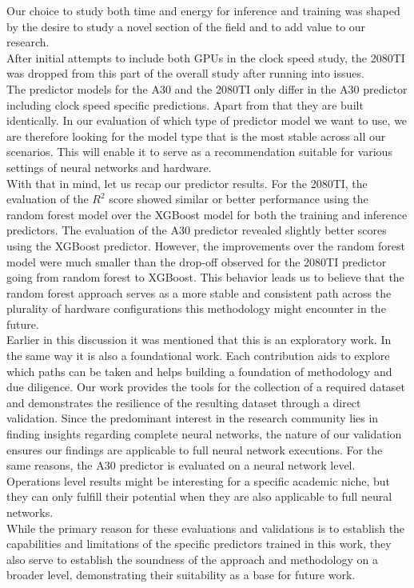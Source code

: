 Our choice to study both time and energy for inference and training was shaped by the desire to study a novel section of the field and to add value to our research.  \\
After initial attempts to include both GPUs in the clock speed study, the 2080TI was dropped from this part of the overall study after running into issues.\\
The predictor models for the A30 and the 2080TI only differ in the A30 predictor including clock speed specific predictions. Apart from that they are built identically. In our evaluation of which type of predictor model we want to use, we are therefore looking for the model type that is the most stable across all our scenarios. This will enable it to serve as a recommendation suitable for various settings of neural networks and hardware. \\
With that in mind, let us recap our predictor results. For the 2080TI, the evaluation of the $R^2$ score showed similar or better performance using the random forest model over the XGBoost model for both the training and inference predictors. The evaluation of the A30 predictor revealed slightly better scores using the XGBoost predictor. However, the improvements over the random forest model were much smaller than the drop-off observed for the 2080TI predictor going from random forest to XGBoost. This behavior leads us to believe that the random forest approach serves as a more stable and consistent path across the plurality of hardware configurations this methodology might encounter in the future. \\
Earlier in this discussion it was mentioned that this is an exploratory work. In the same way it is also a foundational work. Each contribution aids to explore which paths can be taken and helps building a foundation of methodology and due diligence. Our work provides the tools for the collection of a required dataset and demonstrates the resilience of the resulting dataset through a direct validation. Since the predominant interest in the research community lies in finding insights regarding complete neural networks, the nature of our validation ensures our findings are applicable to full neural network executions. For the same reasons, the A30 predictor is evaluated on a neural network level. Operations level results might be interesting for a specific academic niche, but they can only fulfill their potential when they are also applicable to full neural networks. \\
While the primary reason for these evaluations and validations is to establish the capabilities and limitations of the specific predictors trained in this work, they also serve to establish the soundness of the approach and methodology on a broader level, demonstrating their suitability as a base for future work.


